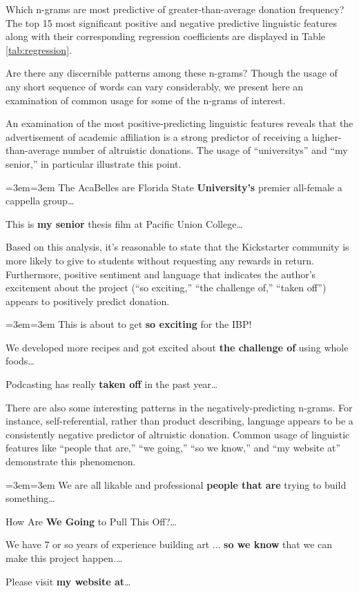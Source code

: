 \documentclass[letterpaper]{article}
\newenvironment{blockquote}{%
  \setlength{\parskip}{.5em}
  \par%
  \small
  \medskip
  \leftskip=3em\rightskip=3em%
  \noindent\ignorespaces}{%
  \par\medskip}
\begin{document}
Which n-grams are most predictive of greater-than-average donation frequency? The top 15 most significant positive and negative predictive linguistic features along with their corresponding regression coefficients are displayed in Table \ref{tab:regression}.

Are there any discernible patterns among these n-grams? Though the usage of any short sequence of words can vary considerably, we present here an examination of common usage for some of the n-grams of interest.

An examination of the most positive-predicting linguistic features reveals that the advertisement of academic affiliation is a strong predictor of receiving a higher-than-average number of altruistic donations. The usage of ``universitys'' and ``my senior,'' in particular illustrate this point.
\begin{blockquote}
The AcaBelles are Florida State \textbf{University's} premier all-female a cappella group\ldots\par\noindent
This is \textbf{my senior} thesis film at Pacific Union College\ldots\par\noindent
\end{blockquote}
Based on this analysis, it's reasonable to state that the Kickstarter community is more likely to give to students without requesting any rewards in return.
Furthermore, positive sentiment and language that indicates the author's excitement about the project (``so exciting,'' ``the challenge of,'' ``taken off'') appears to positively predict donation.
\begin{blockquote}
This is about to get \textbf{so exciting} for the IBP! \par\noindent
We developed more recipes and got excited about \textbf{the challenge of} using whole foods\ldots\par\noindent
Podcasting has really \textbf{taken off} in the past year\ldots
\end{blockquote}
There are also some interesting patterns in the negatively-predicting n-grams. For instance, self-referential, rather than product describing, language appears to be a consistently negative predictor of altruistic donation. Common usage of linguistic features like ``people that are,'' ``we going,'' ``so we know,'' and ``my website at'' demonstrate this phenomenon.
\begin{blockquote}
We are all likable and professional \textbf{people that are} trying to build something\ldots\par\noindent
How Are \textbf{We Going} to Pull This Off?\ldots\par\noindent
We have 7 or so years of experience building art ... \textbf{so we know} that we can make this project happen.\ldots\par\noindent
Please visit \textbf{my website at}\ldots
\end{blockquote}
\end{document}
